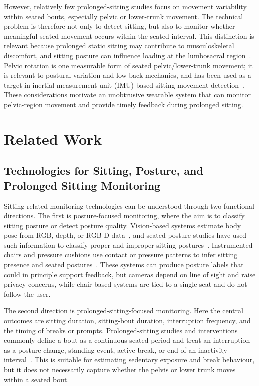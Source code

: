 However, relatively few prolonged-sitting studies focus on movement variability within seated bouts, especially pelvic or lower-trunk movement. The technical problem is therefore not only to detect sitting, but also to monitor whether meaningful seated movement occurs within the seated interval. This distinction is relevant because prolonged static sitting may contribute to musculoskeletal discomfort, and sitting posture can influence loading at the lumbosacral region~\citep{bontrup2019low,kwon2018sitting}. Pelvic rotation is one measurable form of seated pelvic/lower-trunk movement; it is relevant to postural variation and low-back mechanics, and has been used as a target in inertial measurement unit (IMU)-based sitting-movement detection~\citep{liao2026imu_pelvic_rotation}. These considerations motivate an unobtrusive wearable system that can monitor pelvic-region movement and provide timely feedback during prolonged sitting.

\section{Related Work}\label{sec:intro_related_work}

\subsection{Technologies for Sitting, Posture, and Prolonged Sitting Monitoring}

Sitting-related monitoring technologies can be understood through two functional directions. The first is posture-focused monitoring, where the aim is to classify sitting posture or detect posture quality. Vision-based systems estimate body pose from RGB, depth, or RGB-D data~\citep{lan2023vision,shotton2011realtime,zimmermann2018rgbd}, and seated-posture studies have used such information to classify proper and improper sitting postures~\citep{estrada2023machine}. Instrumented chairs and pressure cushions use contact or pressure patterns to infer sitting presence and seated postures~\citep{tan2001sensing,ma2017activity,kappattanavar2021monitoring}. These systems can produce posture labels that could in principle support feedback, but cameras depend on line of sight and raise privacy concerns, while chair-based systems are tied to a single seat and do not follow the user.

The second direction is prolonged-sitting-focused monitoring. Here the central outcomes are sitting duration, sitting-bout duration, interruption frequency, and the timing of breaks or prompts. Prolonged-sitting studies and interventions commonly define a bout as a continuous seated period and treat an interruption as a posture change, standing event, active break, or end of an inactivity interval~\citep{taylor2011prolonged_sitting,kim2015extracting,hargreaves2023move}. This is suitable for estimating sedentary exposure and break behaviour, but it does not necessarily capture whether the pelvis or lower trunk moves within a seated bout.

